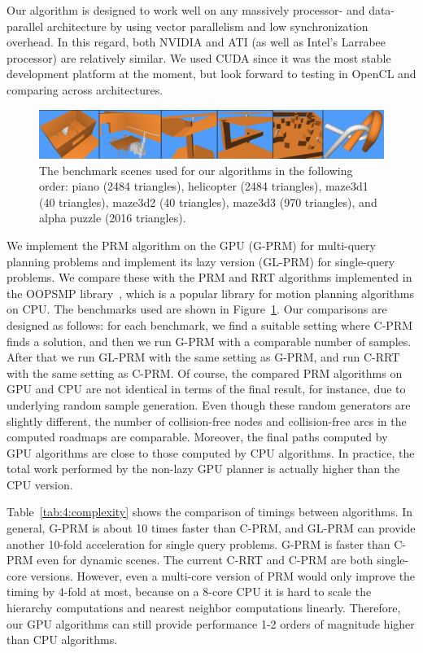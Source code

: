 Our algorithm is designed to work well on any massively processor- and data-parallel architecture by using vector parallelism and low synchronization overhead. In this regard, both NVIDIA and ATI (as well as Intel's Larrabee processor) are relatively similar. We used CUDA since it was the most stable development platform at the moment, but look forward to testing in OpenCL and comparing across architectures.

\begin{figure}[!htb]
  \centering
  \includegraphics[width=0.9\linewidth]{figs/4/benchmarks.png}
  \caption[Benchmark scenes used for the GPU-based planner]{The benchmark scenes used for our algorithms in the following order: piano (2484 triangles), helicopter (2484 triangles), maze3d1 (40 triangles), maze3d2 (40 triangles), maze3d3 (970 triangles), and alpha puzzle (2016 triangles).}
  \label{fig:4:benchmarks}
\end{figure}

We implement the PRM algorithm on the GPU (G-PRM) for multi-query planning problems and implement its lazy version (GL-PRM) for single-query problems. We compare these with the PRM and RRT algorithms implemented in the OOPSMP library~\cite{plaku+2007:OOPSM}, which is a popular library for motion planning algorithms on CPU. The benchmarks used are shown in Figure~\ref{fig:4:benchmarks}. Our comparisons are designed as follows: for each benchmark, we find a suitable setting where C-PRM finds a solution, and then we run G-PRM with a comparable number of samples. After that we run GL-PRM with the same setting as G-PRM, and run C-RRT with the same setting as C-PRM. Of course, the compared PRM algorithms on GPU and CPU are not identical in terms of the final result, for instance, due to underlying random sample generation. Even though these random generators are slightly different, the number of collision-free nodes and collision-free arcs in the computed roadmaps are comparable. Moreover, the final paths computed by GPU algorithms are close to those computed by CPU algorithms. In practice, the total work performed by the non-lazy GPU planner is actually higher than the CPU version.

Table~\ref{tab:4:complexity} shows the comparison of timings between algorithms. In general, G-PRM is about 10 times faster than C-PRM, and GL-PRM can provide another 10-fold acceleration for single query problems. G-PRM is faster than C-PRM even for dynamic scenes. The current C-RRT and C-PRM are both single-core versions. However, even a multi-core version of PRM would only improve the timing by 4-fold at most, because on a 8-core CPU it is hard to scale the hierarchy computations and nearest neighbor computations linearly. Therefore, our GPU algorithms can still provide performance 1-2 orders of magnitude higher than CPU algorithms.

